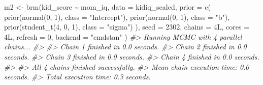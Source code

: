 \documentclass[
  10pt,
  italian,
  a4paper,
  extrafontsizes,onecolumn,openright
  ]{memoir}
\newenvironment{Shaded}{\begin{snugshade}}{\end{snugshade}}
\newcommand{\AttributeTok}[1]{\textcolor[rgb]{0.77,0.63,0.00}{#1}}
\newcommand{\CommentTok}[1]{\textcolor[rgb]{0.56,0.35,0.01}{\textit{#1}}}
\newcommand{\DecValTok}[1]{\textcolor[rgb]{0.00,0.00,0.81}{#1}}
\newcommand{\FunctionTok}[1]{\textcolor[rgb]{0.00,0.00,0.00}{#1}}
\newcommand{\NormalTok}[1]{#1}
\newcommand{\OtherTok}[1]{\textcolor[rgb]{0.56,0.35,0.01}{#1}}
\newcommand{\SpecialCharTok}[1]{\textcolor[rgb]{0.00,0.00,0.00}{#1}}
\newcommand{\StringTok}[1]{\textcolor[rgb]{0.31,0.60,0.02}{#1}}
\theoremstyle{definition}
\theoremstyle{definition}
\theoremstyle{definition}
\theoremstyle{definition}
\theoremstyle{remark}
\begin{document}
\begin{Shaded}
\begin{Highlighting}[]
\NormalTok{m2 }\OtherTok{\textless{}{-}} \FunctionTok{brm}\NormalTok{(kid\_score }\SpecialCharTok{\textasciitilde{}}\NormalTok{ mom\_iq,}
  \AttributeTok{data =}\NormalTok{ kidiq\_scaled,}
  \AttributeTok{prior =} \FunctionTok{c}\NormalTok{(}
    \FunctionTok{prior}\NormalTok{(}\FunctionTok{normal}\NormalTok{(}\DecValTok{0}\NormalTok{, }\DecValTok{1}\NormalTok{), }\AttributeTok{class =} \StringTok{"Intercept"}\NormalTok{),}
    \FunctionTok{prior}\NormalTok{(}\FunctionTok{normal}\NormalTok{(}\DecValTok{0}\NormalTok{, }\DecValTok{1}\NormalTok{), }\AttributeTok{class =} \StringTok{"b"}\NormalTok{),}
    \FunctionTok{prior}\NormalTok{(}\FunctionTok{student\_t}\NormalTok{(}\DecValTok{4}\NormalTok{, }\DecValTok{0}\NormalTok{, }\DecValTok{1}\NormalTok{), }\AttributeTok{class =} \StringTok{"sigma"}\NormalTok{)}
\NormalTok{  ),}
  \AttributeTok{seed =} \DecValTok{2302}\NormalTok{,}
  \AttributeTok{chains =}\NormalTok{ 4L,}
  \AttributeTok{cores =}\NormalTok{ 4L,}
  \AttributeTok{refresh =} \DecValTok{0}\NormalTok{,}
  \AttributeTok{backend =} \StringTok{"cmdstan"}
\NormalTok{)}
\CommentTok{\#\textgreater{} Running MCMC with 4 parallel chains...}
\CommentTok{\#\textgreater{} }
\CommentTok{\#\textgreater{} Chain 1 finished in 0.0 seconds.}
\CommentTok{\#\textgreater{} Chain 2 finished in 0.0 seconds.}
\CommentTok{\#\textgreater{} Chain 3 finished in 0.0 seconds.}
\CommentTok{\#\textgreater{} Chain 4 finished in 0.0 seconds.}
\CommentTok{\#\textgreater{} }
\CommentTok{\#\textgreater{} All 4 chains finished successfully.}
\CommentTok{\#\textgreater{} Mean chain execution time: 0.0 seconds.}
\CommentTok{\#\textgreater{} Total execution time: 0.3 seconds.}
\end{Highlighting}
\end{Shaded}
\end{document}
